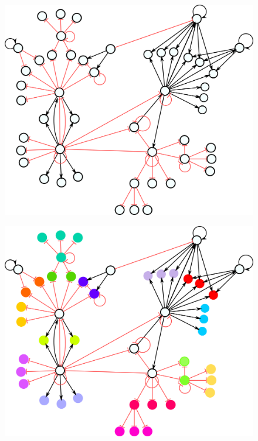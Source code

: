 \documentclass[12pt]{diazessay} %
\begin{document}
\begin{figure}[H]
	\centering
	\includegraphics[scale=0.27]{Figures/result3.png}
	\caption{}
	\label{fig:result3}
\end{figure}
\begin{figure}[H]
	\centering
	\includegraphics[scale=0.27]{Figures/result3-1.png}
	\caption{}
	\label{fig:result3-1}
\end{figure}
\end{document}
